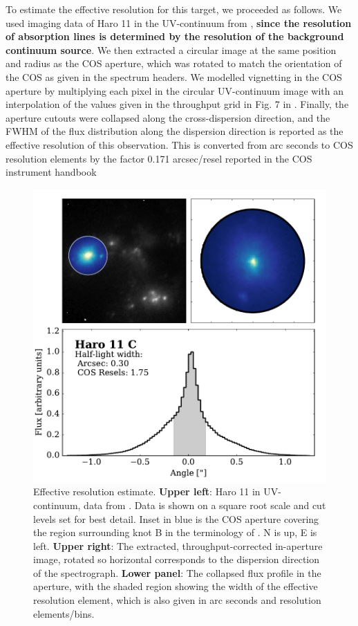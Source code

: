 \documentclass[twocolumn, trackchanges]{aastex61}
\begin{document}
To estimate the effective resolution for this target, we proceeded as
follows. We used imaging data of Haro 11 in the UV-continuum
from \citet{Ostlin2009, Hayes2009}, \textbf{since the resolution of absorption
lines is determined by the resolution of the background continuum source}. We 
then extracted a circular image at the same
position and radius as the COS aperture, which was rotated to match the
orientation of the COS as given in the spectrum headers. We modelled
vignetting in the COS aperture by multiplying each pixel in the circular
UV-continuum image with an interpolation of the values given in the
throughput grid in Fig. 7 in \citet{CosImaging}. Finally, the aperture
cutouts were collapsed along the cross-dispersion direction, and the
FWHM of the flux distribution along the dispersion direction is reported
as the effective resolution of this observation. This is converted from
arc seconds to COS resolution elements by the factor 0.171 arcsec/resel
reported in the COS instrument handbook \citep{CosHandbook}

\begin{figure}
\centering
\includegraphics[width=1.000\hsize]{../Figs/EffResol.pdf}
\caption{Effective resolution estimate. \textbf{Upper left}: Haro 11 in
UV-continuum, data from \citet{Ostlin2009, Hayes2009}. Data is
shown on a square root scale and cut levels set for best detail. Inset
in blue is the COS aperture covering the region surrounding knot
B in the terminology of \citet{Vader1993}. N is up, E is left.
\textbf{Upper right}: The extracted, throughput-corrected in-aperture
image, rotated so horizontal corresponds to the dispersion direction of
the spectrograph. \textbf{Lower panel}: The collapsed flux profile in
the aperture, with the shaded region showing the width of the effective
resolution element, which is also given in arc seconds and resolution
elements/bins.}\label{fig:resol}
\end{figure}
\end{document}
